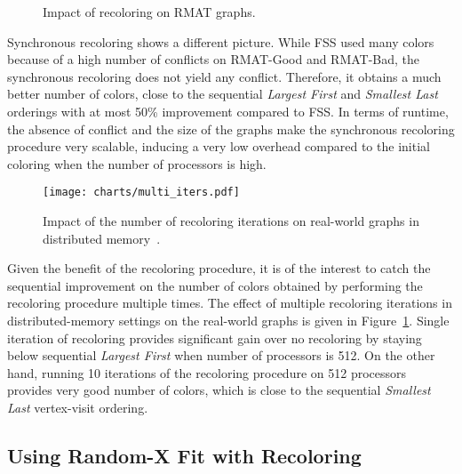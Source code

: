 \documentclass{article}
\begin{document}
\begin{figure}[tbh!]
  \centering
  \caption{Impact of recoloring on RMAT graphs.}
\end{figure}


Synchronous recoloring shows a different picture. While FSS used
many colors because of a high number of conflicts on RMAT-Good
and RMAT-Bad, the synchronous recoloring does not yield any
conflict. Therefore, it obtains a much better number of colors, close
to the sequential {\em Largest First} and {\em Smallest Last} orderings
with at most 50\% improvement compared to FSS. In terms of runtime, the absence of
conflict and the size of the graphs make the synchronous recoloring
procedure very scalable, inducing a very low overhead
compared to the initial coloring when the number of processors is
high.

\begin{figure}
  \centering
  \texttt{[image: charts/multi\_iters.pdf]}
  \caption{Impact of the number of recoloring iterations on real-world graphs
     in distributed memory~\cite{HiPC11}.}
  \label{fig:comp_recolor_iter_dist}
\end{figure}

Given the benefit of the recoloring procedure, it is of the interest
to catch the sequential improvement on the number of colors obtained
by performing the recoloring procedure multiple times. The effect of multiple
recoloring iterations in distributed-memory settings on the real-world
graphs is given in Figure~\ref{fig:comp_recolor_iter_dist}.
Single iteration of recoloring provides significant gain over no recoloring
by staying below sequential {\em Largest First} when number of processors
is 512. On the other hand, running 10 iterations of the recoloring
procedure on 512 processors provides very good number of colors, which is close
to the sequential {\em Smallest Last} vertex-visit ordering.

\subsection{Using Random-X Fit with Recoloring}
\label{sec:usingrand}
\end{document}
